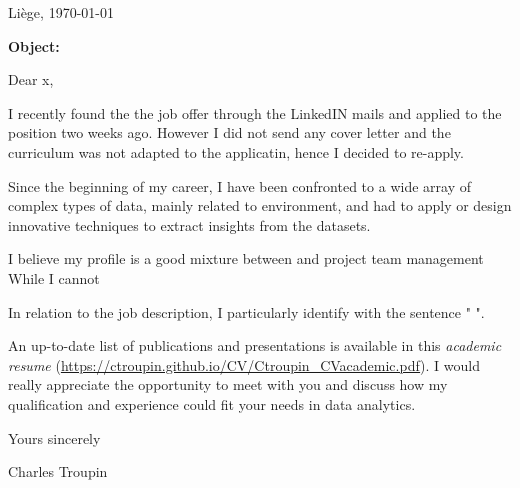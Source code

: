 \documentclass[10pt,a4paper,svgnames]{article}
\newcommand{\imp}[1]{\textcolor{CVblue}{\bf #1}}
\begin{document}
 
\pagestyle{empty}

\hfill Liège, \today 

\vspace{1cm}

\noindent\imp{Object:} 



\vspace{1cm}

Dear x,

\vspace{1cm}


I recently found the the job offer through the LinkedIN mails and applied to the position two weeks ago. However I did not send any cover letter and the curriculum was not adapted to the applicatin, hence I decided to re-apply.

Since the beginning of my career, I have been confronted to a wide array of complex types of data, mainly related to environment, and had to apply or design innovative techniques to extract insights from the datasets. 

I believe my profile is a good mixture between     and project team management 
While I cannot

In relation to the job description, I particularly identify with the sentence " ".


An up-to-date list of publications and presentations is available in this \textit{academic resume} (\url{https://ctroupin.github.io/CV/Ctroupin_CVacademic.pdf}). I would really appreciate the opportunity to meet with you and discuss how my qualification and experience could fit your needs in data analytics.

 

\vspace{1cm}
Yours sincerely


\vspace{2cm}

\hfill Charles Troupin
\end{document}
